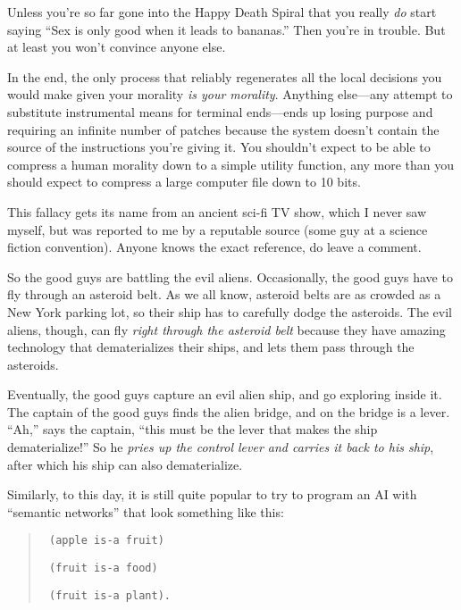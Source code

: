  Unless you're so far gone into the Happy Death
Spiral that you really \textit{do} start saying ``Sex
is only good when it leads to bananas.'' Then
you're in trouble. But at least you
won't convince anyone else.


 In the end, the only process that reliably regenerates all the
local decisions you would make given your morality \textit{is your
morality}. Anything else---any attempt to substitute instrumental means
for terminal ends---ends up losing purpose and requiring an infinite
number of patches because the system doesn't contain
the source of the instructions you're giving it. You
shouldn't expect to be able to compress a human
morality down to a simple utility function, any more than you should
expect to compress a large computer file down to 10 bits.

\myendsectiontext



 This fallacy gets its name from an ancient sci-fi TV show, which I
never saw myself, but was reported to me by a reputable source (some
guy at a science fiction convention). Anyone knows the exact reference,
do leave a comment. 


 So the good guys are battling the evil aliens. Occasionally, the
good guys have to fly through an asteroid belt. As we all know,
asteroid belts are as crowded as a New York parking lot, so their ship
has to carefully dodge the asteroids. The evil aliens, though, can fly
\textit{right through the asteroid belt} because they have amazing
technology that dematerializes their ships, and lets them pass through
the asteroids.


 Eventually, the good guys capture an evil alien ship, and go
exploring inside it. The captain of the good guys finds the alien
bridge, and on the bridge is a lever.
``Ah,'' says the captain,
``this must be the lever that makes the ship
dematerialize!'' So he \textit{pries up the control
lever and carries it back to his ship}, after which his ship can also
dematerialize.


 Similarly, to this day, it is still quite popular to try to
program an AI with ``semantic
networks'' that look something like this:

\begin{quote}
\texttt{
 (apple is-a fruit)}

\texttt{
 (fruit is-a food)}

\texttt{
  (fruit is-a plant).}
\end{quote}


